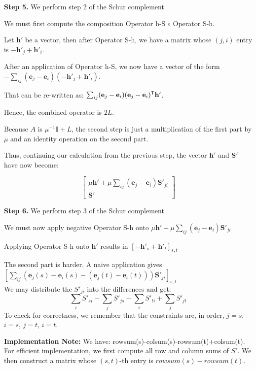 \documentclass{article}
\begin{document}
\textbf{Step 5.} We perform step 2 of the Schur complement

We must first compute the composition Operator h-S $\circ$ Operator S-h. 

Let $\mathbf{h}'$ be a vector, then after Operator S-h, we have a matrix whose $(j,i)$ entry is $ - \mathbf{h}'_j + \mathbf{h}'_i$.

After an application of Operator h-S, we now have a vector of the form $- \sum_{ij} (\mathbf{e}_j - \mathbf{e}_i) ( - \mathbf{h}'_j + \mathbf{h}'_i)$.

That can be re-written as: $\sum_{ij} (\mathbf{e}_j - \mathbf{e}_i) (\mathbf{e}_j - \mathbf{e}_i)^{\mathsf{T}} \mathbf{h}'$. 

Hence, the combined operator is $2L$. 

Because $A$ is $\mu^{-1} \mathbf{I} + L$, the second step is just a multiplication of the first part by $\mu$ and an identity operation on the second part.

Thus, continuing our calculation from the previous step, the vector $\mathbf{h}'$ and $\mathbf{S}'$ have now become:

\[
\left[ \begin{array}{c}
\mu \mathbf{h}' + \mu \sum_{ij} (\mathbf{e}_j - \mathbf{e}_i) \mathbf{S}'_{ji} \\
\mathbf{S}'
\end{array}\right]
\]

\textbf{Step 6.} We perform step 3 of the Schur complement

We must now apply negative Operator S-h onto $\mu \mathbf{h}' + \mu \sum_{ij} (\mathbf{e}_j - \mathbf{e}_i) \mathbf{S}'_{ji} $

Applying Operator S-h onto $\mathbf{h}'$ results in $[- \mathbf{h}'_s + \mathbf{h}'_t]_{s,t}$

The second part is harder. A naive application gives $[\sum_{ij} (\mathbf{e}_j(s) - \mathbf{e}_i(s) - (\mathbf{e}_j(t) - \mathbf{e}_i(t))) \mathbf{S}'_{ji} ]_{s,t}$\\

We may distribute the $S'_{ji}$ into the differences and get:
\[
\sum_i S'_{si} - \sum_j S'_{js} - \sum_i S'_{ti} + \sum_j S'_{jt}
\]
To check for correctness, we remember that the constraints are, in order, $j=s$, $i=s$, $j=t$, $i=t$.

\textbf{Implementation Note:} We have: rowsum(s)-colsum(s)-rowsum(t)+colsum(t). For efficient implementation, we first compute all row and column sums of $S'$. We then construct a matrix whose $(s,t)$-th entry is $rowsum(s) - rowsum(t)$.  
\end{document}
